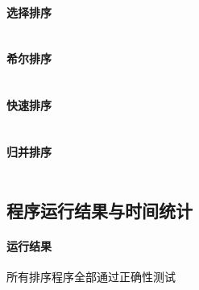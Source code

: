 \documentclass[UTF8]{ctexart}
\begin{document}
      \paragraph{选择排序}
      \inputminted{java}{src/SelectionSort.java}
      \paragraph{希尔排序}
      \inputminted{java}{src/ShellSort.java}
      \paragraph{快速排序}
      \inputminted{java}{src/QuickSort.java}
      \paragraph{归并排序}
      \inputminted{java}{src/MergeSort.java}

    \subsection{程序运行结果与时间统计}
    \paragraph{运行结果} 所有排序程序全部通过正确性测试
\end{document}
